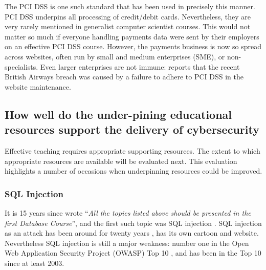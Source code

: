 \documentclass[sigconf]{acmart}
\begin{document}
The PCI DSS \cite{PCI2018b} is one such standard that has been used in precisely this manner. PCI DSS underpins all processing of credit/debit cards. Nevertheless, they are very rarely mentioned in generalist computer scientist courses. This would not matter so much if everyone handling payments data were sent by their employers on an effective PCI DSS course. However, the payments business is now so spread across websites, often run by small and medium enterprises (SME), or non-specialists. Even larger enterprises are not immune: \cite{BritishAirways2018a} reports that the recent British Airways breach was caused by a failure to adhere to PCI DSS in the website maintenance.

\begin{comment}


It is an interesting question as to whether standards such as PCI DSS should be addressed within degree courses (clearly degree courses can never cover all standards) or whether they should be addressed in professional training courses. However, the current situation is not ideal from the perspective of industry (or users of systems). The inclusion of key standards could be seen as a valuable enhancement activity to how cybersecurity it taught.

\end{comment}

\subsection{How well do the under-pining educational resources support the delivery of cybersecurity}
Effective teaching requires appropriate supporting resources. The extent to which appropriate resources are available will be evaluated next. This evaluation highlights a number of occasions when underpinning resources could be improved.

\subsubsection{SQL Injection}
It is 15 years since \cite{Guimaraesetal2004} wrote ``{\emph{All the topics listed above should be presented in the first Database Course}}'', and the first such topic was SQL injection \cite{SPIDynamics2002,Anonymous2018b}. SQL injection as an attack has been around for twenty years \cite{HornerHyslip2017a}, has its own cartoon and website. Nevertheless SQL injection is still a major weakness: number one in the Open Web Application Security Project (OWASP) Top 10 \cite{OWASP2017a}, and has been in the Top 10 since at least 2003. 
\end{document}
